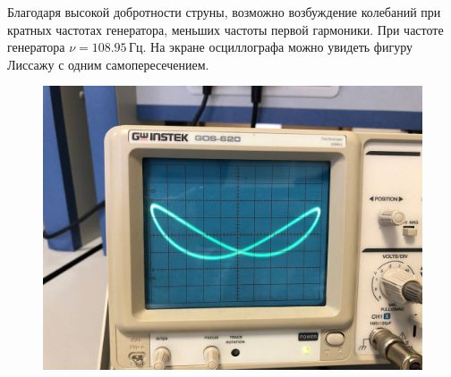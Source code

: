 Благодаря высокой добротности струны, возможно возбуждение колебаний при кратных частотах
генератора, меньших частоты первой гармоники. При частоте генератора $\nu=108.95\,\text{Гц}$.
На экране осциллографа можно увидеть фигуру Лиссажу с одним самопересечением.

\begin{figure}[ht!]
    \centering\includegraphics[width=0.8\linewidth]{img/fuck.jpg}
\end{figure}
